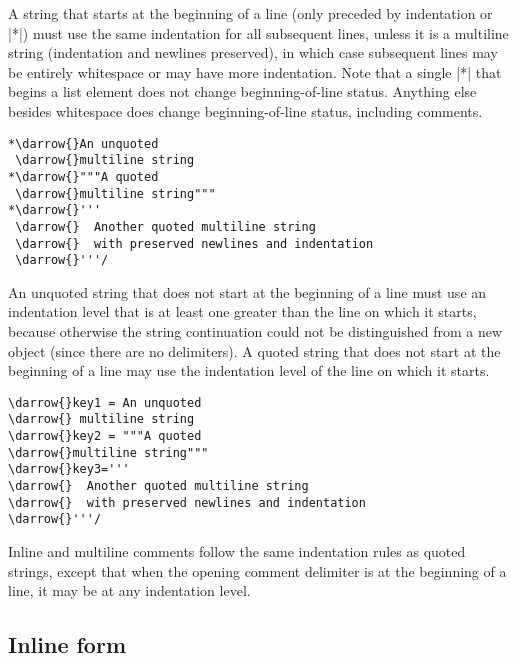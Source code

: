 \documentclass[11pt]{article}
\newcommand{\darrow}{\ensuremath{\textcolor{DarkGreen}{\downarrow}}}
\begin{document}
A string that starts at the beginning of a line (only preceded by indentation or |*|) must use the same indentation for all subsequent lines, unless it is a multiline string (indentation and newlines preserved), in which case subsequent lines may be entirely whitespace or may have more indentation.  Note that a single |*| that begins a list element does not change beginning-of-line status.  Anything else besides whitespace does change beginning-of-line status, including comments. 
\begin{Verbatim}[commandchars=\\\{\}]
*\darrow{}An unquoted
 \darrow{}multiline string
*\darrow{}"""A quoted
 \darrow{}multiline string"""
*\darrow{}'''
 \darrow{}  Another quoted multiline string
 \darrow{}  with preserved newlines and indentation
 \darrow{}'''/
\end{Verbatim}

An unquoted string that does not start at the beginning of a line must use an indentation level that is at least one greater than the line on which it starts, because otherwise the string continuation could not be distinguished from a new object (since there are no delimiters).  A quoted string that does not start at the beginning of a line may use the indentation level of the line on which it starts.
\begin{Verbatim}[commandchars=\\\{\}]
\darrow{}key1 = An unquoted
\darrow{} multiline string
\darrow{}key2 = """A quoted
\darrow{}multiline string"""
\darrow{}key3='''
\darrow{}  Another quoted multiline string
\darrow{}  with preserved newlines and indentation
\darrow{}'''/
\end{Verbatim}

Inline and multiline comments follow the same indentation rules as quoted strings, except that when the opening comment delimiter is at the beginning of a line, it may be at any indentation level.

\subsection{Inline form}
\end{document}
